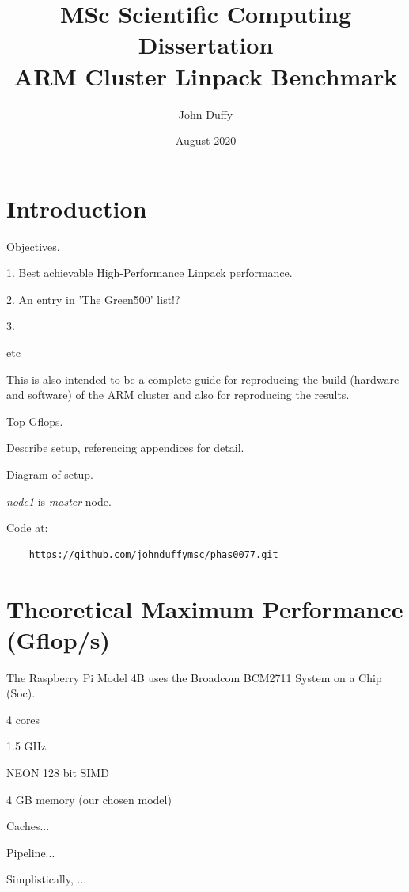 \documentclass{article}
\title{MSc Scientific Computing Dissertation\\ARM Cluster Linpack Benchmark}
\author{John Duffy}
\date{August 2020}
\begin{document}
\maketitle

%
%
\section{Introduction}

Objectives.

1. Best achievable High-Performance Linpack performance.



2. An entry in 'The Green500' list!?

3.

etc

This is also intended to be a complete guide for reproducing the build (hardware and software) of the ARM cluster and also for reproducing the results. 

Top Gflops.

Describe setup, referencing appendices for detail.

Diagram of setup.

\emph{node1} is \emph{master} node.

Code at:

\begin{verbatim}
    https://github.com/johnduffymsc/phas0077.git
\end{verbatim}

%
%
\section{Theoretical Maximum Performance (Gflop/s)}
The Raspberry Pi Model 4B uses the Broadcom BCM2711 System on a Chip (Soc).

4 cores

1.5 GHz

NEON 128 bit SIMD

4 GB memory (our chosen model)

Caches...

Pipeline...

Simplistically, ...
\end{document}
